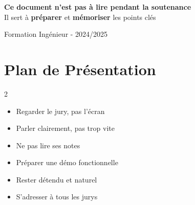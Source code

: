\documentclass[11pt,a4paper]{article}
\begin{document}
\begin{titlepage}
\begin{center}
        \begin{tcolorbox}[
            width=12cm,
            colback=light,
            colframe=primary,
            arc=5pt,
            boxrule=1pt,
            halign=center
        ]
            {\large\textbf{Ce document n'est pas à lire pendant la soutenance}}\\[0.3cm]
            \textcolor{dark}{Il sert à \textbf{préparer} et \textbf{mémoriser} les points clés}
        \end{tcolorbox}

        \vfill

        \textcolor{dark}{ Formation Ingénieur - 2024/2025}
    \end{center}
\end{titlepage}

\newpage
\thispagestyle{empty}


\tableofcontents
\newpage

\part{Plan de Présentation}

\begin{conseilbox}
\begin{multicols}{2}
\begin{itemize}[noitemsep]
    \item[\faIcon{eye}] Regarder le jury, pas l'écran
    \item[\faIcon{comment}] Parler clairement, pas trop vite
    \item[\faIcon{file-alt}] Ne pas lire ses notes
    \item[\faIcon{laptop}] Préparer une démo fonctionnelle
    \item[\faIcon{smile}] Rester détendu et naturel
    \item[\faIcon{users}] S'adresser à tous les jurys
\end{itemize}
\end{multicols}
\end{conseilbox}
\end{document}

